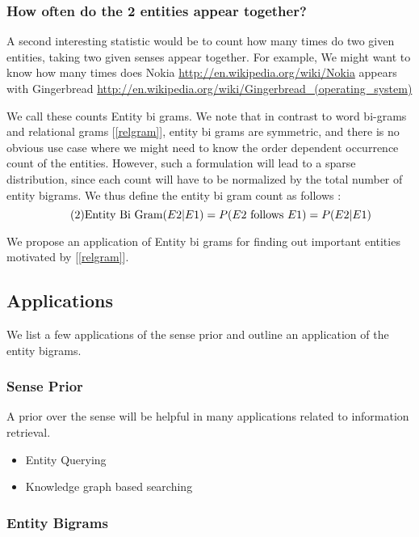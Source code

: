 \subsubsection{How often do the 2 entities appear together?}
A second interesting statistic would be to count how many times do two given entities, taking two given senses appear together.
For example, We might want to know how many times does Nokia \url{http://en.wikipedia.org/wiki/Nokia} appears with Gingerbread \url{http://en.wikipedia.org/wiki/Gingerbread_(operating_system)}

We call these counts Entity bi grams. We note that in contrast to word bi-grams and relational grams [\ref{relgram}], entity bi grams
are symmetric, and there is no obvious use case where we might need to know the order dependent occurrence count of the entities. 
However, such a formulation will lead to a sparse distribution, since each count will have to be normalized by the total number of 
entity bigrams. We thus define the entity bi gram count as follows : 
\begin{equation}
 \tag{2}
 \text{Entity Bi Gram}(E2 | E1) \\  = P(E2\text{ follows }E1) \\ 
	= P(E2 | E1) 
\end{equation}

We propose an application of Entity bi grams for finding out important entities motivated by [\ref{relgram}].

\subsection{Applications}
We list a few applications of the sense prior and outline an application of the entity bigrams.

 \subsubsection{Sense Prior}
 A prior over the sense will be helpful in many applications related to information retrieval. 
 \begin{itemize}
  \item Entity Querying
  \item Knowledge graph based searching
 \end{itemize}

 \subsubsection{Entity Bigrams}
 

